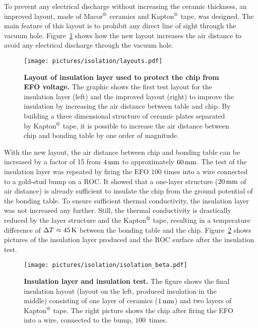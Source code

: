 To prevent any electrical discharge without increasing the ceramic thickness, an improved layout, made of Macor$\rm{\symbR}$ ceramics and Kapton$\rm{\symbR}$ tape, was designed. The main feature of this layout is to prohibit any direct line of sight through the vacuum hole. Figure~\ref{fig:insulation_layout} shows how the new layout increases the air distance to avoid any electrical discharge through the vacuum hole.
\begin{figure}
\begin{center}
\texttt{[image: pictures/isolation/layouts.pdf]}
\end{center}
\caption[Layout of insulation layer used to protect chip from EFO voltage]{\textbf{Layout of insulation layer used to protect the chip from \ac{EFO} voltage.} The graphic shows the first test layout for the insulation layer (left) and the improved layout (right) to improve the insulation by increasing the air distance between table and chip. By building a three dimensional structure of ceramic plates separated by Kapton$\rm{\symbR}$ tape, it is possible to increase the air distance between chip and bonding table by one order of magnitude.}\label{fig:insulation_layout}
\end{figure}
With the new layout, the air distance between chip and bonding table can be increased by a factor of 15 from $4\,\rm{mm}$ to approximately $60\,\rm{mm}$. The test of the insulation layer was repeated by firing the \ac{EFO} $100$ times into a wire connected to a gold-stud bump on a \acs{ROC}. It showed that a one-layer structure ($20\,\rm{mm}$ of air distance) is already sufficient to insulate the chip from the ground potential of the bonding table. To ensure sufficient thermal conductivity, the insulation layer was not increased any further. Still, the thermal conductivity is drastically reduced by the layer structure and the Kapton$\rm{\symbR}$ tape, resulting in a temperature difference of $\Delta T\approx 45\,\rm{K}$ between the bonding table and the chip. Figure~\ref{pic:insulation} shows pictures of the insulation layer produced and the \acs{ROC} surface after the insulation test.
\begin{figure}
\begin{center}
\texttt{[image: pictures/isolation/isolation\_beta.pdf]}
\end{center}
\caption[Insulation layer and test of insulation quality]{\textbf{Insulation layer and insulation test.} The figure shows the final insulation layout (layout on the left, produced insulation in the middle) consisting of one layer of ceramics ($1\,\rm{mm}$) and two layers of Kapton$\rm{\symbR}$ tape. The right picture shows the chip after firing the \ac{EFO} into a wire, connected to the bump, $100\,$ times.}\label{pic:insulation}
\end{figure}

